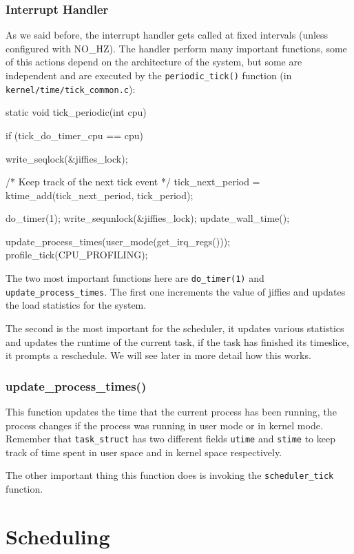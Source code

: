 \documentclass[10pt]{book}
\begin{document}
\subsubsection{Interrupt Handler}

As we said before, the interrupt handler gets called at fixed intervals (unless configured with NO\_HZ). The handler perform many important functions, some of this actions depend on the architecture of the system, but some are independent and are executed by the \verb|periodic_tick()| function (in \verb|kernel/time/tick_common.c|):

\begin{code}
static void tick_periodic(int cpu)
{
	if (tick_do_timer_cpu == cpu) {
		write_seqlock(&jiffies_lock);

		/* Keep track of the next tick event */
		tick_next_period = ktime_add(tick_next_period, tick_period);

		do_timer(1);
		write_sequnlock(&jiffies_lock);
		update_wall_time();
	}

	update_process_times(user_mode(get_irq_regs()));
	profile_tick(CPU_PROFILING);
}
\end{code}
The two most important functions here are \verb|do_timer(1)| and \verb|update_process_times|. The first one increments the value of jiffies and updates the load statistics for the system.

The second is the most important for the scheduler, it updates various statistics and updates the runtime of the current task, if the task has finished its timeslice, it prompts a reschedule. We will see later in more detail how this works.

\subsubsection{update\_process\_times()}
This function updates the time that the current process has been running, the process changes if the process was running in user mode or in kernel mode. Remember that \verb|task_struct| has two different fields \verb|utime| and \verb|stime| to keep track of time spent in user space and in kernel space respectively.

The other important thing this function does is invoking the \verb|scheduler_tick| function.

\section{Scheduling}
\end{document}
